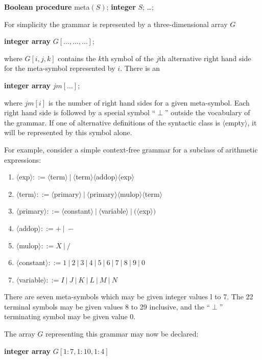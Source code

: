 \quad \textbf{Boolean procedure} meta$(S)$; \textbf{integer} $S$; \dots;

\noindent
For simplicity the grammar is represented by a three-dimensional array $G$

\quad \textbf{integer array} $G[\dots, \dots, \dots]$;

\noindent
where $G[i, j, k]$ contains the $k$th symbol of the $j$th alternative right hand side for the meta-symbol represented by $i$. There is an

\quad \textbf{integer array} $jm[\dots]$;

\noindent
where $jm[i]$ is the number of right hand sides for a given meta-symbol. Each right hand side is followed by a special symbol ``$\perp$'' outside the vocabulary of the grammar. If one of alternative definitions of the syntactic class is $\langle$empty$\rangle$, it will be represented by this symbol alone.

For example, consider a simple context-free grammar for a subclass of arithmetic expressions:

\begin{enumerate}[wide, nosep, label=(\arabic*)]
	\item $\langle$exp$\rangle ::= \langle$term$\rangle\ |\ \langle$term$\rangle\langle$addop$\rangle\langle$exp$\rangle$
	\item $\langle$term$\rangle ::= \langle$primary$\rangle\ |\ \langle$primary$\rangle\langle$mulop$\rangle\langle$term$\rangle$
	\item $\langle$primary$\rangle ::= \langle$constant$\rangle\ |\ \langle$variable$\rangle\ |\ (\langle$exp$\rangle)$
	\item $\langle$addop$\rangle ::= +\ |\ -$
	\item $\langle$mulop$\rangle ::= X\ |\ /$
	\item $\langle$constant$\rangle ::= 1\ |\ 2\ |\ 3\ |\ 4\ |\ 5\ |\ 6\ |\ 7\ |\ 8\ |\ 9\ |\ 0$
	\item $\langle$variable$\rangle ::= I\ |\ J\ |\ K\ |\ L\ |\ M\ |\ N$
\end{enumerate}

There are seven meta-symbols which may be given integer values l to 7. The 22 terminal symbols may be given values 8 to 29 inclusive, and the ``$\perp$'' terminating symbol may be given value 0.

\noindent
The array $G$ representing this grammar may now be declared:

\quad \textbf{integer array} $G[1:7, 1:10, 1:4]$

